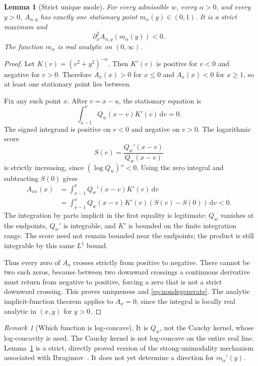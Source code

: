 \documentclass[11pt]{article}
\numberwithin{equation}{section}
\newtheorem{lemma}[theorem]{Lemma}
\theoremstyle{definition}
\theoremstyle{remark}
\newtheorem{remark}[theorem]{Remark}
\newcommand{\dd}{\,\mathrm d}
\newcommand{\Qw}{Q_w}
\begin{document}
\begin{lemma}[Strict unique mode]\label{lem:mode}
For every admissible $w$, every $\alpha>0$, and every $y>0$,
$A_{\alpha,y}$ has exactly one stationary point
$m_\alpha(y)\in(0,1)$. It is a strict maximum and
\begin{equation}\label{eq:nondegenerate}
 \partial_x^2A_{\alpha,y}(m_\alpha(y))<0.
\end{equation}
The function $m_\alpha$ is real analytic on $(0,\infty)$.
\end{lemma}
\begin{proof}
Let $K(v)=(v^2+y^2)^{-\alpha}$. Then $K'(v)$ is positive for $v<0$
and negative for $v>0$. Therefore $A_x(x)>0$ for $x\le0$ and
$A_x(x)<0$ for $x\ge1$, so at least one stationary point lies between.

Fix any such point $x$. After $v=x-u$, the stationary equation is
\[
 \int_{x-1}^{x}\Qw(x-v)K'(v)\dd v=0.
\]
The signed integrand is positive on $v<0$ and negative on $v>0$.
The logarithmic score
\[
 S(v)=\frac{\Qw'(x-v)}{\Qw(x-v)}
\]
is strictly increasing, since $(\log\Qw)''<0$. Using the zero integral
and subtracting $S(0)$ gives
\begin{align*}
 A_{xx}(x)
 &=\int_{x-1}^{x}\Qw'(x-v)K'(v)\dd v\\
 &=\int_{x-1}^{x}\Qw(x-v)K'(v)(S(v)-S(0))\dd v<0.
\end{align*}
The integration by parts implicit in the first equality is legitimate:
$\Qw$ vanishes at the endpoints, $\Qw'$ is integrable, and $K'$ is
bounded on the finite integration range. The score need not remain
bounded near the endpoints; the product is still integrable by this
same $L^1$ bound.

Thus every zero of $A_x$ crosses strictly from positive to negative.
There cannot be two such zeros, because between two downward crossings
a continuous derivative must return from negative to positive, forcing
a zero that is not a strict downward crossing. This proves uniqueness
and \eqref{eq:nondegenerate}. The analytic implicit-function theorem
applies to $A_x=0$, since the integral is locally real analytic in
$(x,y)$ for $y>0$.
\end{proof}

\begin{remark}[Which function is log-concave]
It is $\Qw$, not the Cauchy kernel, whose log-concavity is used.
The Cauchy kernel is not log-concave on the entire real line.
Lemma~\ref{lem:mode} is a strict, directly proved version of the
strong-unimodality mechanism associated with Ibragimov~\cite{ibragimov}.
It does not yet determine a direction for $m_\alpha'(y)$.
\end{remark}
\end{document}
